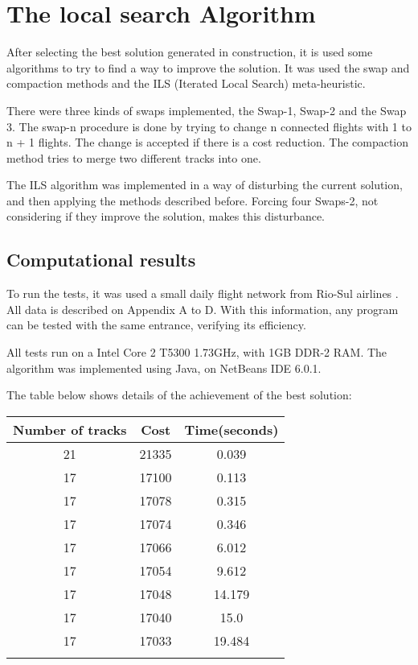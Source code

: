 \documentclass{endm}
\begin{document}
\section{The local search Algorithm}

After selecting the best solution generated in construction, it is used some algorithms to try to find a way to improve the solution. It was used the swap and compaction methods and the ILS (Iterated Local Search) meta-heuristic.

There were three kinds of swaps implemented, the Swap-1, Swap-2 and the Swap 3. The swap-n procedure is done by trying to change n connected flights with 1 to n + 1 flights. The change is accepted if there is a cost reduction. The compaction method tries to merge two different tracks into one. 

The ILS algorithm was implemented in a way of disturbing the current solution, and then applying the methods described before. Forcing four Swaps-2, not considering if they improve the solution, makes this disturbance.


\subsection{Computational results}

To run the tests, it was used a small daily flight network from Rio-Sul airlines \cite{pimentel2005}. All data is described on Appendix A to D. With this information, any program can be tested with the same entrance, verifying its efficiency. 

All tests run on a Intel Core 2 T5300 1.73GHz, with 1GB DDR-2 RAM. The algorithm was implemented using Java, on NetBeans IDE 6.0.1.

The table below shows details of the achievement of the best solution:\\


\begin{center}

\label {tabela1}
\begin{tabular}{ccc} 

\hline

Number of tracks & Cost & Time(seconds) \\ 

\hline
\hline
21 & 21335 & 0.039 \\
17 & 17100 & 0.113 \\
17 & 17078 & 0.315 \\
17 & 17074 & 0.346 \\
17 & 17066 & 6.012 \\
17 & 17054 & 9.612 \\
17 & 17048 & 14.179 \\
17 & 17040 & 15.0 \\
17 & 17033 & 19.484 \\
\hline
&  & \\
\end{tabular}

\end{center}
\end{document}
